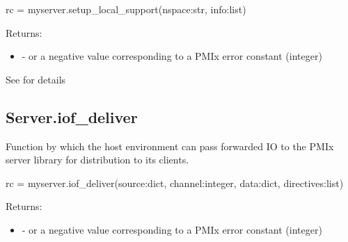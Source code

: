\format

\pyspecificstart
\begin{codepar}
rc = myserver.setup_local_support(nspace:str, info:list)
\end{codepar}
\pyspecificend


\begin{arglist}
\end{arglist}

Returns:

\begin{itemize}
    \item {} -  or a negative value corresponding to a PMIx error constant (integer)
\end{itemize}


See  for details


\subsection{Server.iof_deliver}

\summary
Function by which the host environment can pass forwarded \ac{IO} to the \ac{PMIx} server library for distribution to its clients.

\format

\pyspecificstart
\begin{codepar}
rc = myserver.iof_deliver(source:dict, channel:integer,
                          data:dict, directives:list)
\end{codepar}
\pyspecificend


\begin{arglist}
\end{arglist}

Returns:

\begin{itemize}
    \item {} -  or a negative value corresponding to a PMIx error constant (integer)
\end{itemize}


